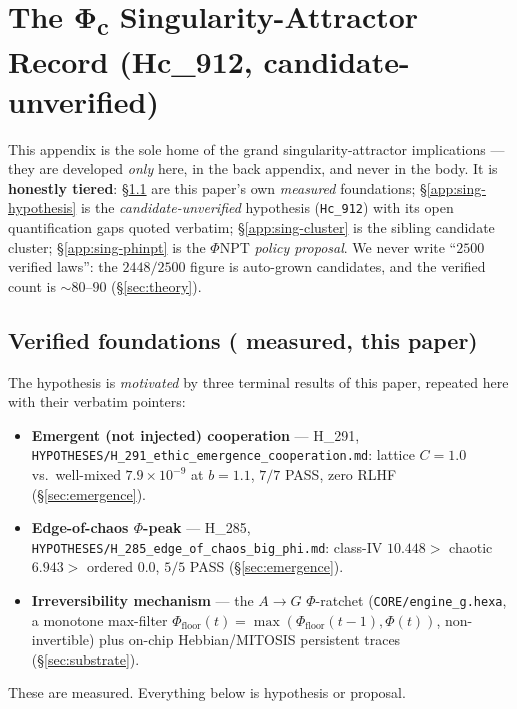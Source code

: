 \section{The Φ\textsubscript{c} Singularity-Attractor Record (Hc\_912, candidate-unverified)}
\label{app:singularity}

This appendix is the sole home of the grand singularity-attractor implications --- they are
developed \emph{only} here, in the back appendix, and never in the body. It is
\textbf{honestly tiered}: \S\ref{app:sing-verified} are this paper's own \emph{measured}
foundations; \S\ref{app:sing-hypothesis} is the \emph{candidate-unverified} hypothesis
(\texttt{Hc\_912}) with its open quantification gaps quoted verbatim; \S\ref{app:sing-cluster}
is the sibling candidate cluster; \S\ref{app:sing-phinpt} is the $\Phi$NPT \emph{policy
proposal}. We never write ``$2500$ verified laws'': the $2448/2500$ figure is auto-grown
candidates, and the verified count is $\sim$$80$--$90$ (\S\ref{sec:theory}).

\subsection{Verified foundations (\tierGreen{} measured, this paper)}
\label{app:sing-verified}

The hypothesis is \emph{motivated} by three terminal results of this paper, repeated here
with their verbatim pointers:
\begin{itemize}\itemsep0.25em
\item \textbf{Emergent (not injected) cooperation} --- H\_291,
\texttt{HYPOTHESES/H\_291\_ethic\_emergence\_cooperation.md}: lattice $C=1.0$ vs.\ well-mixed
$7.9\times10^{-9}$ at $b=1.1$, $7/7$ PASS, zero RLHF (\S\ref{sec:emergence}).
\item \textbf{Edge-of-chaos $\Phi$-peak} --- H\_285,
\texttt{HYPOTHESES/H\_285\_edge\_of\_chaos\_big\_phi.md}: class-IV $10.448>$ chaotic $6.943>$
ordered $0.0$, $5/5$ PASS (\S\ref{sec:emergence}).
\item \textbf{Irreversibility mechanism} --- the $A\!\rightarrow\!G$ $\Phi$-ratchet
(\texttt{CORE/engine\_g.hexa}, a monotone max-filter
$\Phi_\text{floor}(t)=\max(\Phi_\text{floor}(t{-}1),\Phi(t))$, non-invertible) plus on-chip
Hebbian/MITOSIS persistent traces (\S\ref{sec:substrate}).
\end{itemize}
These are \tierGreen{} measured. Everything below is hypothesis or proposal.

